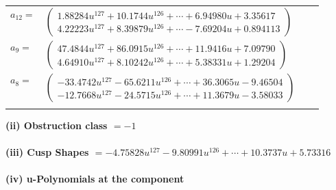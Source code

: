 \documentclass[1p]{elsarticle_modified}
\theoremstyle{definition}
\begin{document}
\begin{tabular}{m{7pt} m{180pt} m{7pt} m{180pt} }
\flushright $a_{12}=$&$\begin{pmatrix}1.88284 u^{127}+10.1744 u^{126}+\cdots+6.94980 u+3.35617\\4.22223 u^{127}+8.39879 u^{126}+\cdots-7.69204 u+0.894113\end{pmatrix}$ \\
\flushright $a_{9}=$&$\begin{pmatrix}47.4844 u^{127}+86.0915 u^{126}+\cdots+11.9416 u+7.09790\\4.64910 u^{127}+8.10242 u^{126}+\cdots+5.38331 u+1.29204\end{pmatrix}$ \\
\flushright $a_{8}=$&$\begin{pmatrix}-33.4742 u^{127}-65.6211 u^{126}+\cdots+36.3065 u-9.46504\\-12.7668 u^{127}-24.5715 u^{126}+\cdots+11.3679 u-3.58033\end{pmatrix}$\\&\end{tabular}
\flushleft \textbf{(ii) Obstruction class $= -1$}\\~\\
\flushleft \textbf{(iii) Cusp Shapes $= -4.75828 u^{127}-9.80991 u^{126}+\cdots+10.3737 u+5.73316$}\\~\\
\newpage\renewcommand{\arraystretch}{1}
\flushleft \textbf{(iv) u-Polynomials at the component}\newline \\
\end{document}
